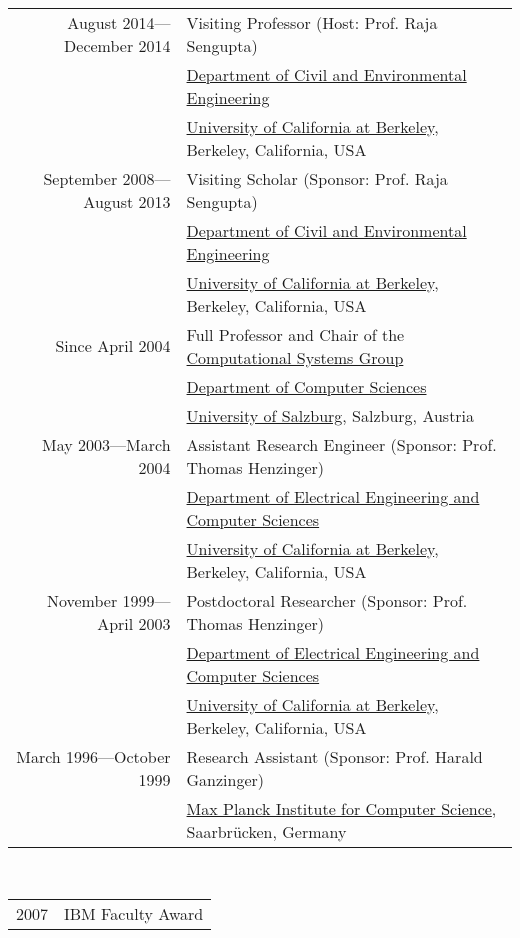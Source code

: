  \\
\begin{tabular}{rl}
August 2014---December 2014 & Visiting Professor (Host: Prof. Raja Sengupta)\\
                     & \href{http://www.ce.berkeley.edu}{Department of Civil and Environmental Engineering} \\
                     & \href{http://www.berkeley.edu}{University of California at Berkeley}, Berkeley, California, USA \\
\noalign{\smallskip}
September 2008---August 2013 & Visiting Scholar (Sponsor: Prof. Raja Sengupta)\\
                     & \href{http://www.ce.berkeley.edu}{Department of Civil and Environmental Engineering} \\
                     & \href{http://www.berkeley.edu}{University of California at Berkeley}, Berkeley, California, USA \\
\noalign{\smallskip}
Since April 2004 & Full Professor and Chair of the \href{http://www.cs.uni-salzburg.at/~ck/group}{Computational Systems Group} \\ %
                 & \href{http://www.cs.uni-salzburg.at}{Department of Computer Sciences} \\
                 & \href{http://www.sbg.ac.at}{University of Salzburg}, Salzburg, Austria \\
\noalign{\smallskip}
May 2003---March 2004 & Assistant Research Engineer (Sponsor: Prof. Thomas Henzinger)\\
                 & \href{http://www.eecs.berkeley.edu}{Department of Electrical Engineering and Computer Sciences} \\
                 & \href{http://www.berkeley.edu}{University of California at Berkeley}, Berkeley, California, USA \\
\noalign{\smallskip}
November 1999---April 2003 & Postdoctoral Researcher (Sponsor: Prof. Thomas Henzinger)\\
                 & \href{http://www.eecs.berkeley.edu}{Department of Electrical Engineering and Computer Sciences} \\
                 & \href{http://www.berkeley.edu}{University of California at Berkeley}, Berkeley, California, USA \\
\noalign{\smallskip}
March 1996---October 1999 & Research Assistant (Sponsor: Prof. Harald Ganzinger)\\
                 & \href{http://www.mpi-sb.mpg.de}{Max Planck Institute for Computer Science}, Saarbr{\"u}cken, Germany \\
\end{tabular}

 \\
\begin{tabular}{rl}
2007 & IBM Faculty Award
\end{tabular}

\newpage
